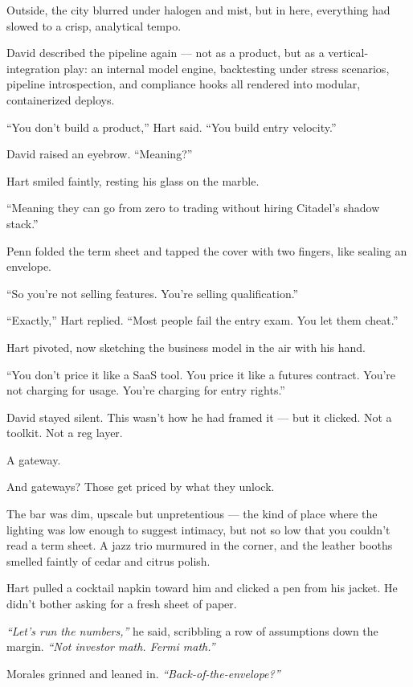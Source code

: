 Outside, the city blurred under halogen and mist, but in here, everything had slowed to a crisp, analytical tempo.

David described the pipeline again — not as a product, but as a vertical-integration play:  
an internal model engine, backtesting under stress scenarios, pipeline introspection, and compliance hooks all rendered 
into modular, containerized deploys.

“You don’t build a product,” Hart said. “You build entry velocity.”

David raised an eyebrow. “Meaning?”

Hart smiled faintly, resting his glass on the marble.

“Meaning they can go from zero to trading without hiring Citadel’s shadow stack.”

Penn folded the term sheet and tapped the cover with two fingers, like sealing an envelope.

“So you’re not selling features. You’re selling qualification.”

“Exactly,” Hart replied. “Most people fail the entry exam. You let them cheat.”

Hart pivoted, now sketching the business model in the air with his hand.

“You don’t price it like a SaaS tool. You price it like a futures contract.  
You’re not charging for usage. You’re charging for entry rights.”

David stayed silent. This wasn’t how he had framed it — but it clicked.  
Not a toolkit. Not a reg layer.

A gateway.

And gateways? Those get priced by what they unlock.




The bar was dim, upscale but unpretentious --- the kind of place where the lighting was low enough to suggest intimacy, 
but not so low that you couldn’t read a term sheet. A jazz trio murmured in the corner, and the leather booths smelled 
faintly of cedar and citrus polish.

Hart pulled a cocktail napkin toward him and clicked a pen from his jacket. He didn’t bother asking for a fresh sheet of paper.

\textit{``Let’s run the numbers,''} he said, scribbling a row of assumptions down the margin. \textit{``Not investor math. 
Fermi math.''}

Morales grinned and leaned in. \textit{``Back-of-the-envelope?''}

